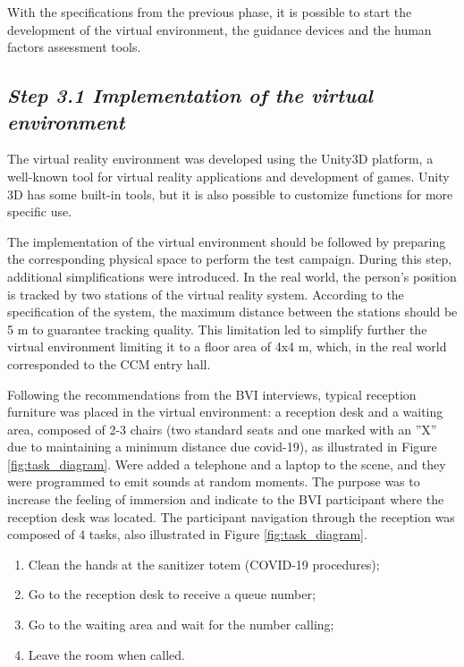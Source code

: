     With the specifications from the previous phase, it is possible to start the development of the virtual environment, the guidance devices and the human factors assessment tools.

    \subsection*{\textit{Step 3.1 Implementation of the virtual environment}}
    \label{subsec:virtual_world_creation}

        The virtual reality environment was developed using the Unity3D platform, a well-known tool for virtual reality applications and development of games. Unity 3D has some built-in tools, but it is also possible to customize functions for more specific use\cite{wang2010new}.
    
        The implementation of the virtual environment should be followed by preparing the corresponding physical space to perform the test campaign. During this step, additional simplifications were introduced. In the real world, the person's position is tracked by two stations of the virtual reality system. According to the specification of the system, the maximum distance between the stations should be 5 m to guarantee tracking quality. This limitation led to simplify further the virtual environment limiting it to a floor area of 4x4 m, which, in the real world corresponded to the CCM entry hall. 
        
        Following the recommendations from the BVI interviews, typical reception furniture was placed in the virtual environment: a reception desk and a waiting area, composed of 2-3 chairs (two standard seats and one marked with an ”X” due to maintaining a minimum distance due covid-19), as illustrated in Figure \ref{fig:task_diagram}. Were added a telephone and a laptop to the scene, and they were programmed to emit sounds at random moments. The purpose was to increase the feeling of immersion and indicate to the BVI participant where the reception desk was located.
        The participant navigation through the reception was composed of 4 tasks, also illustrated in Figure \ref{fig:task_diagram}.
        
        \begin{enumerate}
            \item Clean the hands at the sanitizer totem (COVID-19 procedures);
            \item Go to the reception desk to receive a queue number;
            \item Go to the waiting area and wait for the number calling;
            \item Leave the room when called.
        \end{enumerate}
        
